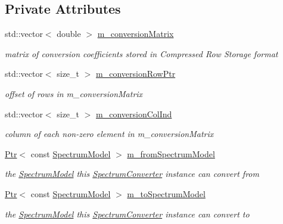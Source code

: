 \subsection*{Private Attributes}
\begin{DoxyCompactItemize}
\item 
std\+::vector$<$ double $>$ \hyperlink{classns3_1_1SpectrumConverter_a099d906c2994643e9e37b4eeea96f8e8}{m\+\_\+conversion\+Matrix}
\begin{DoxyCompactList}\small\item\em matrix of conversion coefficients stored in Compressed Row Storage format \end{DoxyCompactList}\item 
std\+::vector$<$ size\+\_\+t $>$ \hyperlink{classns3_1_1SpectrumConverter_ae0fa415f07184df143b9ecfb826eb345}{m\+\_\+conversion\+Row\+Ptr}
\begin{DoxyCompactList}\small\item\em offset of rows in m\+\_\+conversion\+Matrix \end{DoxyCompactList}\item 
std\+::vector$<$ size\+\_\+t $>$ \hyperlink{classns3_1_1SpectrumConverter_af316fdc8ed648d55b46fb7e6f52f7412}{m\+\_\+conversion\+Col\+Ind}
\begin{DoxyCompactList}\small\item\em column of each non-\/zero element in m\+\_\+conversion\+Matrix \end{DoxyCompactList}\item 
\hyperlink{classns3_1_1Ptr}{Ptr}$<$ const \hyperlink{classns3_1_1SpectrumModel}{Spectrum\+Model} $>$ \hyperlink{classns3_1_1SpectrumConverter_a152eb969ac726014de6563397bee9fc7}{m\+\_\+from\+Spectrum\+Model}
\begin{DoxyCompactList}\small\item\em the \hyperlink{classns3_1_1SpectrumModel}{Spectrum\+Model} this \hyperlink{classns3_1_1SpectrumConverter}{Spectrum\+Converter} instance can convert from \end{DoxyCompactList}\item 
\hyperlink{classns3_1_1Ptr}{Ptr}$<$ const \hyperlink{classns3_1_1SpectrumModel}{Spectrum\+Model} $>$ \hyperlink{classns3_1_1SpectrumConverter_aa99d9ccf13de156a7691b5c12e34a3dc}{m\+\_\+to\+Spectrum\+Model}
\begin{DoxyCompactList}\small\item\em the \hyperlink{classns3_1_1SpectrumModel}{Spectrum\+Model} this \hyperlink{classns3_1_1SpectrumConverter}{Spectrum\+Converter} instance can convert to \end{DoxyCompactList}\end{DoxyCompactItemize}
